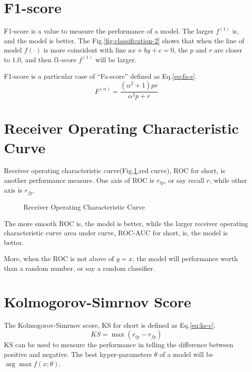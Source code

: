 \section{F1-score}
\label{sec:f1-s}

F1-score is a value to measure the performance of a model.
The larger $f^{(1)}$ is, and the model is better.
The Fig.\ref{fig:classification-2} shows that when the line of model $f(\cdot)$ is more coincident
with line $ax+by+c=0$, the $p$ and $r$ are closer to $1.0$,
and then f1-score $f^{(1)}$ will be larger.

F1-score is a particular case of ``Fa-score'' defined as Eq.\ref{eq:fa-s}.
\begin{equation}
    \label{eq:fa-s}
    F^{(\alpha)} = \frac{\left(\alpha^2+1\right)pr}{\alpha^2p + r}
\end{equation}

\section{Receiver Operating Characteristic Curve}
\label{sec:roc}

Receiver operating characteristic curve(Fig.\ref{fig:roc},red curve), ROC for short, is another performance measure.
One axis of ROC is $r_{tp}$, or say recall $r$, while other axis is $r_{fp}$.
\begin{figure}
    \centering
    \caption{Receiver Operating Characteristic Curve}
    \label{fig:roc}
\end{figure}
The more smooth ROC is, the model is better, while the larger
receiver operating characteristic curve area under curve, ROC-AUC for short, is,
the model is better.

More, when the ROC is not above of $y=x$, the model will performance worth than a random number,
or say a random classifier.

\section{Kolmogorov-Simrnov Score}
\label{sec:ks-c}

The Kolmogorov-Simrnov score, KS for short is defined as Eq.\ref{eq:ks-c}.
\begin{equation}
    \label{eq:ks-c}
    KS = \max\left(r_{tp} - r_{fp}\right)
\end{equation}
KS can be used to measure the performance in telling the difference between positive and negative.
The best hyper-parameters $\theta$ of a model will be $\arg\max f(x;\theta)$.


